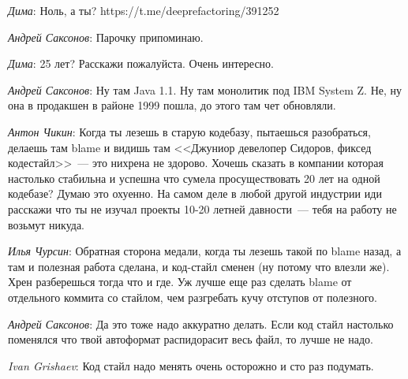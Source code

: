 \documentclass[10pt]{book}
\newcommand{\AUTHOR}[1]{\emph{#1}:}
\begin{document}
\AUTHOR{Дима} Ноль, а ты? https://t.me/deeprefactoring/391252

\AUTHOR{Андрей Саксонов} Парочку припоминаю.

\AUTHOR{Дима} 25 лет? Расскажи пожалуйста. Очень интересно.

\AUTHOR{Андрей Саксонов} Ну там Java 1.1. Ну там монолитик под IBM System Z. Не, ну
она в продакшен в районе 1999 пошла, до этого там чет обновляли.

\AUTHOR{Антон Чикин} Когда ты лезешь в старую кодебазу, пытаешься разобраться,
делаешь там blame и видишь там <<Джуниор девелопер Сидоров, фиксед кодестайл>>~---
это нихрена не здорово. Хочешь сказать в компании которая настолько стабильна и
успешна что сумела просуществовать 20 лет на одной кодебазе? Думаю это
охуенно. На самом деле в любой другой индустрии иди расскажи что ты не изучал
проекты 10-20 летней давности~--- тебя на работу не возьмут никуда.

\AUTHOR{Илья Чурсин} Обратная сторона медали, когда ты лезешь такой по blame
назад, а там и полезная работа сделана, и код-стайл сменен (ну потому что влезли
же). Хрен разберешься тогда что и где. Уж лучше еще раз сделать blame от
отдельного коммита со стайлом, чем разгребать кучу отступов от полезного.

\AUTHOR{Андрей Саксонов} Да это тоже надо аккуратно делать. Если код стайл настолько
поменялся что твой автоформат распидорасит весь файл, то лучше не надо.

\AUTHOR{Ivan Grishaev} Код стайл надо менять очень осторожно и сто раз подумать.
\end{document}
